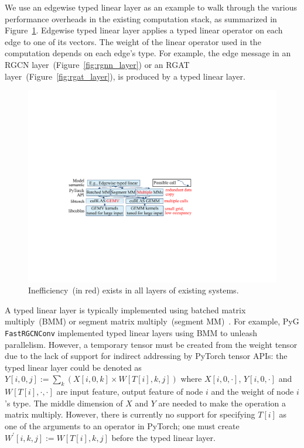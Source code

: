 We use an edgewise typed linear layer as an example to walk through the various performance overheads in the existing computation stack, as summarized in Figure~\ref{fig:inefficient_stack}. 
Edgewise typed linear layer applies a typed linear operator on each edge to one of its vectors. The weight of the linear operator used in the computation depends on each edge's type. For example, the edge message in an RGCN layer~(Figure~\ref{fig:rgnn_layer}) or an RGAT layer~(Figure~\ref{fig:rgat_layer}), is produced by a typed linear layer.

\begin{figure}[!t]
\centering
\includegraphics[width=0.8\linewidth]{figures/Hector/StackInefficiencyCompactv3.compact.pdf}
\caption{\label{fig:inefficient_stack} Inefficiency~(in red) exists in all layers of existing systems.}
\end{figure}

A typed linear layer is typically implemented using batched matrix multiply~(BMM) or segment matrix multiply~(segment MM)~\cite{isratsegmm}. 
For example, PyG \texttt{FastRGCNConv} implemented typed linear layers using BMM to unleash parallelism. However, a temporary tensor must be created from the weight tensor due to the lack of support for indirect addressing by PyTorch tensor APIs: the typed linear layer could be denoted as  $Y[i,0,j]:=\sum_k(X[i,0,k]\times W[T[i],k,j])$ where $X[i,0,\cdot]$, $Y[i,0,\cdot]$ and $W[T[i],\cdot,\cdot]$ are input feature, output feature of node $i$ and the weight of node $i$'s type. The middle dimension of $X$ and $Y$ are needed to make the operation a matrix multiply. However, there is currently no support for specifying $T[i]$ as one of the arguments to an operator in PyTorch;  
one must create $W^\prime[i,k,j]:=W[T[i],k,j]$ before the typed linear layer.


